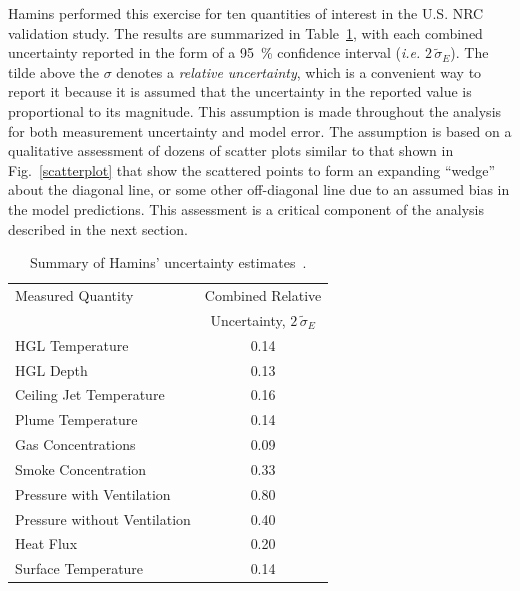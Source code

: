 Hamins performed this exercise for ten quantities of interest in the U.S. NRC validation study. The results are summarized in Table~\ref{Uncertainty}, with
each combined uncertainty reported in the form of a 95~\% confidence interval ({\em i.e.} $2 \, \widetilde{\sigma}_E$). The tilde above the $\sigma$ denotes a
{\em relative uncertainty}, which is a convenient way to report it because it is assumed that the uncertainty in the reported value is proportional to
its magnitude. This assumption is made throughout the analysis for both measurement uncertainty and model error. The assumption is based on a
qualitative assessment of dozens of scatter plots similar to that shown in Fig.~\ref{scatterplot} that show the scattered points to form an expanding ``wedge''
about the diagonal line, or some other off-diagonal line due to an assumed bias in the model predictions. This assessment is a critical component of the
analysis described in the next section.

\begin{table}[t]
\caption{Summary of Hamins' uncertainty estimates~\cite{NUREG_1824}. }
\begin{center}
\begin{tabular}{|l|c|}
\hline
Measured Quantity               & Combined Relative       \\
                                & Uncertainty, $2 \, \widetilde{\sigma}_E$       \\ \hline \hline
HGL Temperature                 & 0.14    \\ \hline
HGL Depth                       & 0.13    \\ \hline
Ceiling Jet Temperature         & 0.16    \\ \hline
Plume Temperature               & 0.14    \\ \hline
Gas Concentrations              & 0.09    \\ \hline
Smoke Concentration             & 0.33    \\ \hline
Pressure with Ventilation       & 0.80    \\ \hline
Pressure without Ventilation    & 0.40    \\ \hline
Heat Flux                       & 0.20    \\ \hline
Surface Temperature             & 0.14    \\ \hline
\end{tabular}
\end{center}
\label{Uncertainty}
\end{table}


